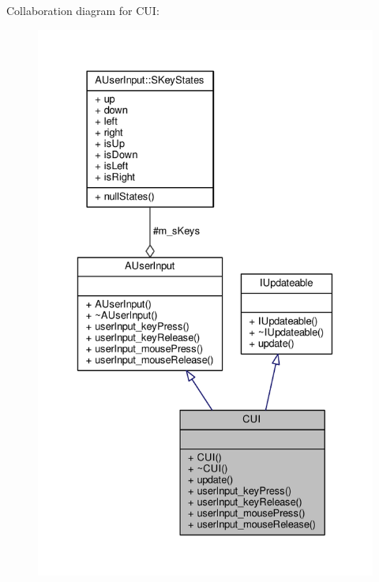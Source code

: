 Collaboration diagram for C\-U\-I\-:\nopagebreak
\begin{figure}[H]
\begin{center}
\leavevmode
\includegraphics[width=331pt]{classCUI__coll__graph}
\end{center}
\end{figure}
